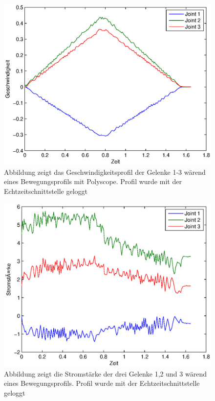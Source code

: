 \begin{figure}[H]
  \centering
    \includegraphics[width=1\textwidth]{pic/velocity_profile_polyscope.eps}
      \caption[Geschwindigkeitsprofil wärend der Bewegung der Gelenke 1-3 mit Polyscope]{Abbildung zeigt das Geschwindigkeitsprofil der Gelenke 1-3 wärend eines Bewegungsprofils mit Polyscope. Profil wurde mit der Echtzeitschnittstelle geloggt}
      \label{fig:velocity_joints_rci}
\end{figure}

\begin{figure}[H]
  \centering
    \includegraphics[width=1\textwidth]{pic/current_profile_polyscope.eps}
      \caption[Stromstärke wärend der Bewegung der Gelenke 1-3 mit Polyscope]{Abbildung zeigt die Stromstärke der drei Gelenke 1,2 und 3 wärend eines Bewegungsprofils. Profil wurde mit der Echtzeitschnittstelle geloggt}
      \label{fig:acceleration_profile_rci}
\end{figure}

